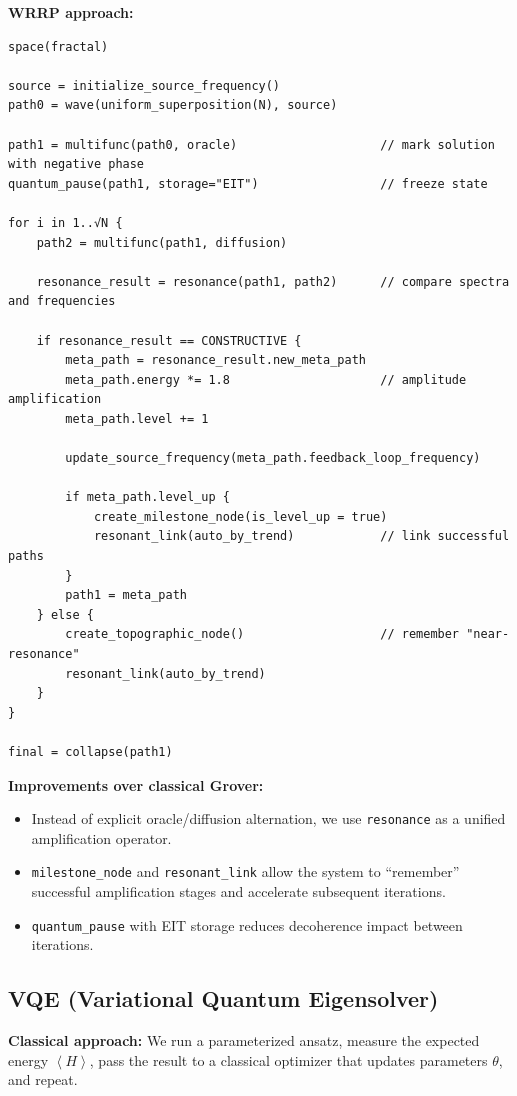 \documentclass[11pt,a4paper]{article}
\newcommand{\expect}[1]{\left\langle#1\right\rangle}
\begin{document}
\textbf{WRRP approach:}
\begin{verbatim}
space(fractal)

source = initialize_source_frequency()
path0 = wave(uniform_superposition(N), source)

path1 = multifunc(path0, oracle)                    // mark solution with negative phase
quantum_pause(path1, storage="EIT")                 // freeze state

for i in 1..√N {
    path2 = multifunc(path1, diffusion)
    
    resonance_result = resonance(path1, path2)      // compare spectra and frequencies
    
    if resonance_result == CONSTRUCTIVE {
        meta_path = resonance_result.new_meta_path
        meta_path.energy *= 1.8                     // amplitude amplification
        meta_path.level += 1
        
        update_source_frequency(meta_path.feedback_loop_frequency)
        
        if meta_path.level_up {
            create_milestone_node(is_level_up = true)
            resonant_link(auto_by_trend)            // link successful paths
        }
        path1 = meta_path
    } else {
        create_topographic_node()                   // remember "near-resonance"
        resonant_link(auto_by_trend)
    }
}

final = collapse(path1)
\end{verbatim}

\textbf{Improvements over classical Grover:}
\begin{itemize}[leftmargin=*]
    \item Instead of explicit oracle/diffusion alternation, we use \texttt{resonance} as a unified amplification operator.
    \item \texttt{milestone\_node} and \texttt{resonant\_link} allow the system to ``remember'' successful amplification stages and accelerate subsequent iterations.
    \item \texttt{quantum\_pause} with EIT storage reduces decoherence impact between iterations.
\end{itemize}

\subsection{VQE (Variational Quantum Eigensolver)}

\textbf{Classical approach:} We run a parameterized ansatz, measure the expected energy $\expect{H}$, pass the result to a classical optimizer that updates parameters $\theta$, and repeat.
\end{document}
